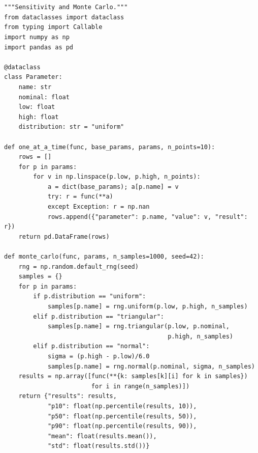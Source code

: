\documentclass[10pt,a4paper,openany]{book}
\begin{document}
\chapter{}
\begin{lstlisting}
"""Sensitivity and Monte Carlo."""
from dataclasses import dataclass
from typing import Callable
import numpy as np
import pandas as pd

@dataclass
class Parameter:
    name: str
    nominal: float
    low: float
    high: float
    distribution: str = "uniform"

def one_at_a_time(func, base_params, params, n_points=10):
    rows = []
    for p in params:
        for v in np.linspace(p.low, p.high, n_points):
            a = dict(base_params); a[p.name] = v
            try: r = func(**a)
            except Exception: r = np.nan
            rows.append({"parameter": p.name, "value": v, "result": r})
    return pd.DataFrame(rows)

def monte_carlo(func, params, n_samples=1000, seed=42):
    rng = np.random.default_rng(seed)
    samples = {}
    for p in params:
        if p.distribution == "uniform":
            samples[p.name] = rng.uniform(p.low, p.high, n_samples)
        elif p.distribution == "triangular":
            samples[p.name] = rng.triangular(p.low, p.nominal,
                                             p.high, n_samples)
        elif p.distribution == "normal":
            sigma = (p.high - p.low)/6.0
            samples[p.name] = rng.normal(p.nominal, sigma, n_samples)
    results = np.array([func(**{k: samples[k][i] for k in samples})
                        for i in range(n_samples)])
    return {"results": results,
            "p10": float(np.percentile(results, 10)),
            "p50": float(np.percentile(results, 50)),
            "p90": float(np.percentile(results, 90)),
            "mean": float(results.mean()),
            "std": float(results.std())}
\end{lstlisting}
\end{document}
